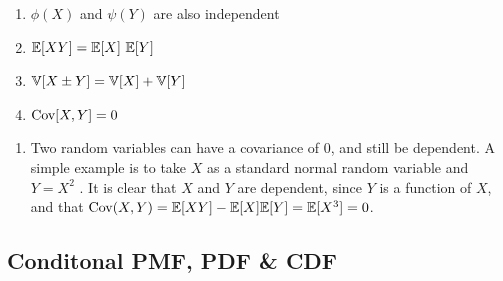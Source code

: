 \begin{multicols}{2}
\begin{enumerate}[resume*=calcrulesrv]
    \item $\phi(X)$ and $\psi(Y)$ are also independent
    \hfill \cite{statistics/book/Statistics-for-Data-Scientists/Maurits-Kaptein}

    \item $\mbbE[X Y]  = \mbbE[X]\ \mbbE[Y]$
    \hfill \cite{statistics/book/Statistics-for-Data-Scientists/Maurits-Kaptein}

    \item $\mathbb{V}[X \pm Y] = \mathbb{V}[X] + \mathbb{V}[Y]$
    \hfill \cite{statistics/book/Statistics-for-Data-Scientists/Maurits-Kaptein}

    \item $\text{Cov}[X, Y] = 0$
    \hfill \cite{statistics/book/Statistics-for-Data-Scientists/Maurits-Kaptein}
\end{enumerate}
\end{multicols}



\begin{enumerate}[resume*=calcrulesrv]
    \item Two random variables can have a covariance of $0$, and still be dependent.
    A simple example is to take $X$ as a standard normal random variable and $Y = X^2$ .
    It is clear that $X$ and $Y$ are dependent, since $Y$ is a function of $X$, and that $\text{Cov}(X, Y ) = \mathbb{E}[X Y] - \mathbb{E}[X] \mathbb{E}[Y] = \mathbb{E}[X^3] = 0$.
    \hfill \cite{statistics/book/Statistics-for-Data-Scientists/Maurits-Kaptein}
\end{enumerate}




\subsection{Conditonal PMF, PDF \& CDF}


